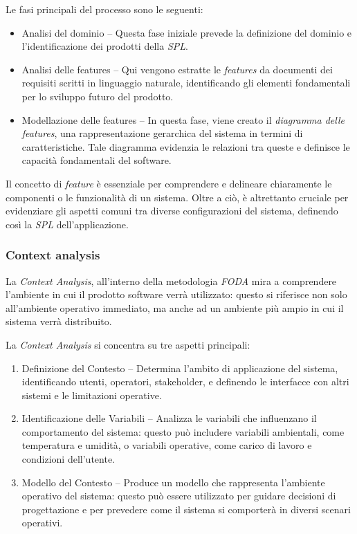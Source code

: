 \documentclass[12pt]{report}
\newcommand{\spl}{\textsl{SPL}\xspace}
\newcommand{\foda}{\textsl{FODA}\xspace}
\begin{document}
Le fasi principali del processo sono le seguenti:

\begin{itemize}
\item \textsf{Analisi del dominio} -- Questa fase iniziale prevede la definizione del dominio e l'identificazione dei prodotti della \spl.
\item \textsf{Analisi delle features} -- Qui vengono estratte le \textit{features} da documenti dei requisiti scritti in linguaggio naturale, identificando gli elementi fondamentali per lo sviluppo futuro del prodotto.
\item \textsf{Modellazione delle features} -- In questa fase, viene creato il \textit{diagramma delle features}, una rappresentazione gerarchica del sistema in termini di caratteristiche. Tale diagramma evidenzia le relazioni tra queste e definisce le capacità fondamentali del software.
\end{itemize}

Il concetto di \textit{feature} è essenziale per comprendere e delineare chiaramente le componenti o le funzionalità di un sistema. Oltre a ciò, è altrettanto cruciale per evidenziare gli aspetti comuni tra diverse configurazioni del sistema, definendo così la \spl dell'applicazione.


\subsubsection{Context analysis}
La \textit{Context Analysis}, all'interno della metodologia \foda  mira a comprendere l'ambiente in cui il prodotto software verrà utilizzato: questo si riferisce non solo all'ambiente operativo immediato, ma anche ad un ambiente più ampio in cui il sistema verrà distribuito.

La \textit{Context Analysis} si concentra su tre aspetti principali:

\begin{enumerate}
\item \textsf{Definizione del Contesto} -- Determina l'ambito di applicazione del sistema, identificando utenti, operatori, stakeholder, e definendo le interfacce con altri sistemi e le limitazioni operative.
\item \textsf{Identificazione delle Variabili} -- Analizza le variabili che influenzano il comportamento del sistema: questo può includere variabili ambientali, come temperatura e umidità, o variabili operative, come carico di lavoro e condizioni dell'utente.
\item \textsf{Modello del Contesto} -- Produce un modello che rappresenta l'ambiente operativo del sistema: questo può essere utilizzato per guidare decisioni di progettazione e per prevedere come il sistema si comporterà in diversi scenari operativi.
\end{enumerate}
\end{document}
